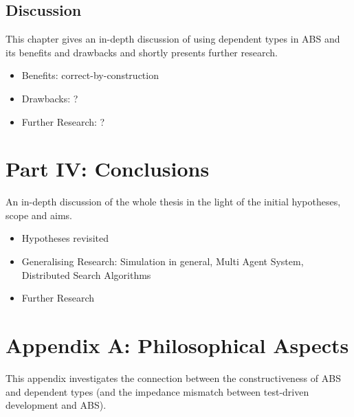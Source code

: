 \subsection{Discussion}
This chapter gives an in-depth discussion of using dependent types in ABS and its benefits and drawbacks and shortly presents further research.
\begin{itemize}
	\item Benefits: correct-by-construction
	\item Drawbacks: ?
	\item Further Research: ?
\end{itemize}

\section{Part IV: Conclusions}
An in-depth discussion of the whole thesis in the light of the initial hypotheses, scope and aims.
\begin{itemize}
	\item Hypotheses revisited
	\item Generalising Research: Simulation in general, Multi Agent System, Distributed Search Algorithms
	\item Further Research
\end{itemize}

\section{Appendix A: Philosophical Aspects}
This appendix investigates the connection between the constructiveness of ABS and dependent types (and the impedance mismatch between test-driven development and ABS).